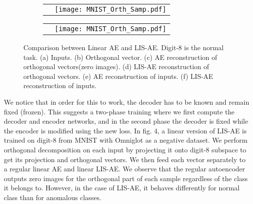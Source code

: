 \documentclass[acmtog, nonacm]{acmart}
\begin{document}
\begin{figure}
\begin{subfigure}[b]{0.75\linewidth}
\begin{tabular}
      {ll}
      \begin{turn}{90}
      \makebox[1.5cm]{
      \begin{turn}{-90}
      (e) 
      \end{turn}}\end{turn}
      &
   \texttt{[image: MNIST\_Orth\_Samp.pdf]}
      \\
 \end{tabular}
  \label{fig:mnist5} 
\end{subfigure}

\begin{subfigure}[b]{0.75\linewidth}
\begin{tabular}
      {ll}
      \begin{turn}{90}
      \makebox[1.5cm]{
      \begin{turn}{-90}
      (f) 
      \end{turn}}\end{turn}
      &
   \texttt{[image: MNIST\_Orth\_Samp.pdf]}
      
 \end{tabular}
  \label{fig:mnist6} 
\end{subfigure}




\caption{Comparison between Linear AE and LIS-AE. Digit-8 is the normal task. (a) Inputs. (b) Orthogonal vector. (c) AE reconstruction of orthogonal vectors(zero images). (d) LIS-AE reconstruction  of orthogonal vectors. (e) AE reconstruction of inputs. (f) LIS-AE reconstruction of inputs.}
\end{figure}

We notice that in order for this to work, the decoder  has to be known and remain fixed (frozen). This suggests a two-phase training where we first compute the decoder and encoder networks, and in the second phase the decoder is fixed while the encoder  is modified using the new loss. In fig. 4, a linear version of LIS-AE is trained on digit-8 from MNIST with Omniglot as a negative dataset. We perform orthogonal decomposition on each input by projecting it onto digit-8 subspace to get its projection and orthogonal vectors.
We then feed each vector separately to a regular linear AE and linear LIS-AE. We observe that the regular autoencoder outputs zero images for the orthogonal part of each sample regardless of the class it belongs to. However, in the case of LIS-AE, it behaves differently for normal class than for anomalous classes.
\end{document}
